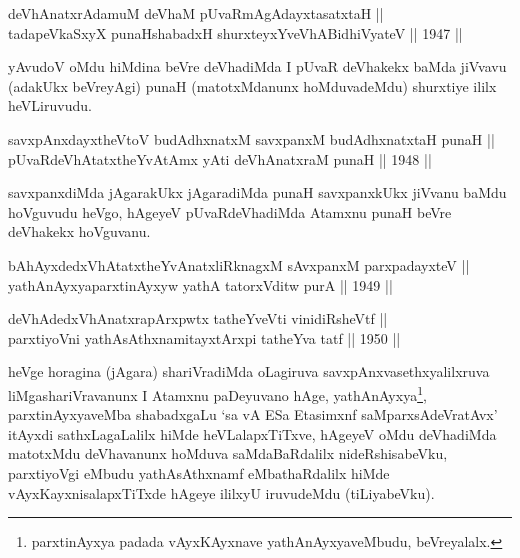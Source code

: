 
\begin{shl}
deVhAnatxrAdamuM deVhaM pUvaRmAgAdayxtasatxtaH || \\
tadapeVkaSxyX punaHshabadxH shurxteyxYveVhABidhiVyateV \hfill || 1947 ||
  
\end{shl}

\begin{artha}
yAvudoV oMdu hiMdina beVre deVhadiMda I pUvaR deVhakekx baMda jiVvavu (adakUkx beVreyAgi) punaH (matotxMdanunx hoMduvadeMdu) shurxtiye ililx heVLiruvudu.
\end{artha}


\begin{shl}
savxpAnxdayxtheVtoV budAdhxnatxM savxpanxM budAdhxnatxtaH punaH || \\
pUvaRdeVhAtatxtheYvA\s \s tAmx yAti deVhAnatxraM punaH \hfill || 1948 ||
  
\end{shl}

\begin{artha}
savxpanxdiMda jAgarakUkx jAgaradiMda punaH savxpanxkUkx jiVvanu baMdu
hoVguvudu heVgo, hAgeyeV pUvaRdeVhadiMda Atamxnu punaH beVre deVhakekx
hoVguvanu.
\end{artha}


\begin{shl}
bAhAyxdedxVhAtatxtheYvAnatxliRknagxM sAvxpanxM parxpadayxteV || \\
yathAnAyxyaparxtinAyxyw yathA tatorxVditw purA \hfill || 1949 ||
  
\end{shl}

\begin{shl}
deVhAdedxVhAnatxrapArxpwtx tatheYveVti vinidiRsheVtf ||  \\
parxtiyoVni yathAsAthxnamitayxtArxpi tatheYva tatf \hfill || 1950 ||
  
\end{shl}

\begin{artha}
heVge horagina (jAgara) shariVradiMda oLagiruva
savxpAnxvasethxyalilxruva liMgashariVravanunx I Atamxnu paDeyuvano
hAge, yathAnAyxya\footnote[1]{parxtinAyxya padada vAyxKAyxnave
yathAnAyxyaveMbudu, beVreyalalx.}, parxtinAyxyaveMba shabadxgaLu
`sa vA ESa Etasimxnf saMparxsAdeVratAvx' itAyxdi sathxLagaLalilx hiMde heVLalapxTiTxve, hAgeyeV oMdu
deVhadiMda matotxMdu deVhavanunx hoMduva saMdaBaRdalilx
nideRshisabeVku, parxtiyoVgi eMbudu yathAsAthxnamf eMbathaRdalilx
hiMde vAyxKayxnisalapxTiTxde hAgeye ililxyU iruvudeMdu (tiLiyabeVku).
\end{artha}

